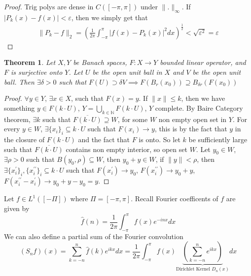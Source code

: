 \documentclass[13pt]{article}
\newtheorem{theorem}{Theorem}
\theoremstyle{definition}
\theoremstyle{remark}
\begin{document}
\begin{proof}
    Trig polys are dense in $C([-\pi,\pi])$ under $\|.\|_\infty$. If $|P_k(x) - f(x)| < \varepsilon$, then we simply get that 
    \begin{align*}
        \|P_k - f\|_2 = (\frac{1}{2\pi} \int_{-\pi}^\pi |f(x) - P_k(x)|^2dx)^\frac{1}{2} < \sqrt{\varepsilon^2} = \varepsilon
    \end{align*}

\end{proof}

\begin{theorem}
	Let $X,Y$ be Banach spaces, $F \colon X \to Y$ bounded linear operator, and $F$ is surjective onto $Y$. Let $U$ be the open unit ball in $X$ and $V$ be the open unit ball. Then $\exists \delta > 0$ such that $F(U) \supset \delta V \implies F(B_r(x_0)) \supseteq B_{\delta r} (F(x_0))$
\end{theorem}
\begin{proof}
	$\forall y \in Y$, $\exists x \in X$, such that $F(x) = y$. If $\|x\| \leq k$, then we have something $y \in F(k\cdot U)$, $Y = \bigcup_{k \in \mathbb{N}} F(k \cdot U)$, $Y$ complete. By Baire Category theorem, $\exists k$ such that $\overline{F(k\cdot U)} \supseteq W$, for some $W$ non empty open set in $Y$. For every $y \in W$, $\exists \{x_i\}_i \subseteq k \cdot U$ such that $F(x_i) \to y$, this is by the fact that $y$ in the closure of $F(k\cdot U)$ and the fact that $F$ is onto. So let $k$ be sufficiently large such that $\overline{F(k \cdot U)}$ contains non empty interior, so open set $W$. Let $y_0 \in W$, $\exists \rho >0$ such that $B(y_0, \rho) \subseteq W$, then $y_0 + y \in W$, if $\|y\| < \rho$, then $\exists \{x_i^\prime\}_i, \{x^{\prime\prime}_i\}_i \subseteq k \cdot U$ such that $F(x_i^\prime) \to y_0$, $F(x_i^{\prime\prime}) \to y_0 + y$, $F(x_i^{\prime\prime}- x_i^\prime) \to y_0 + y - y_0 = y$.  
\end{proof}

Let $f \in L^1([-\Pi])$ where $\Pi = [-\pi,\pi]$. Recall Fourier coefficents of $f$ are given by 
$$
    \hat{f}(n) = \frac{1}{2\pi} \int_{-\pi}^\pi f(x)e^{-inx}dx
$$
We can also define a partial sum of the Fourier convolution
$$
    (S_n f)(x) = \sum_{k=-n}^n \hat{f}(k) e^{ikx}dx = \frac{1}{2\pi} \int_{-\pi}^\pi f(x) \underbrace{\left(\sum_{k=-n}^n e^{ikx}\right)}_{\text{Dirichlet Kernel $D_n(x)$}} dx 
$$
\end{document}

